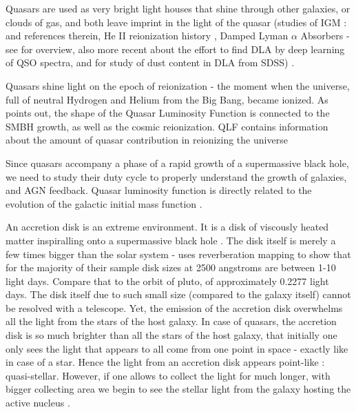 \documentclass[modern]{aastex62}
\begin{document}
Quasars are used as very bright light houses that shine through other galaxies, or clouds of gas, and both leave imprint in the light of the quasar  (studies of IGM : \cite{prochaska2014} and references therein,  He II reionization history \cite{khrykin2017} , Damped Lyman $\alpha$ Absorbers - see \cite{wolfe2005} for overview, also more recent \cite{parks2018} about the effort to find DLA by deep learning of QSO spectra, and \cite{murphy2016} for study of  dust content in DLA from SDSS) .  

Quasars shine light on the epoch of reionization - the moment when the universe, full of neutral Hydrogen and Helium from the Big Bang, became ionized. As  \cite{alsayyad2016} points out, the shape of the Quasar Luminosity Function is connected to the SMBH growth, as well as the cosmic reionization. QLF contains information about the amount of quasar contribution in reionizing the universe \citep{glikman2011, masters2012, ross2013}




Since quasars accompany a phase of a rapid growth of a supermassive black hole, we need to study their duty cycle to properly understand the growth of galaxies, and AGN feedback. Quasar luminosity function is directly related to the evolution of the galactic initial mass function \citep{mcgreer2013}. 

An accretion disk is an extreme environment. It is a disk of viscously heated matter inspiralling onto a supermassive black hole \citep{ruan2017}. The disk itself is merely a few times bigger than  the solar system -  \citep{mudd2017} uses reverberation mapping to show that for the majority of their sample disk sizes at 2500 angstroms are between 1-10 light days. Compare that to the orbit of pluto, of approximately 0.2277 light days. The disk itself due to such small size (compared to the galaxy itself) cannot be resolved with a telescope.  Yet, the emission of the accretion disk overwhelms all the light from the stars of the host galaxy.   In case of quasars, the accretion disk is so much brighter than all the stars of the host galaxy, that initially one only sees the light that appears to all come from one point in space - exactly like in case of a star. Hence the light from an accretion disk appears point-like : quasi-stellar. However,  if one allows to collect the light for much longer, with bigger collecting area  we begin to see the stellar light from the galaxy hosting the active nucleus \citep{hutchings2002,kotilainen2013, falomo2014, liuzzo2016, bayliss2017}. 
\end{document}
